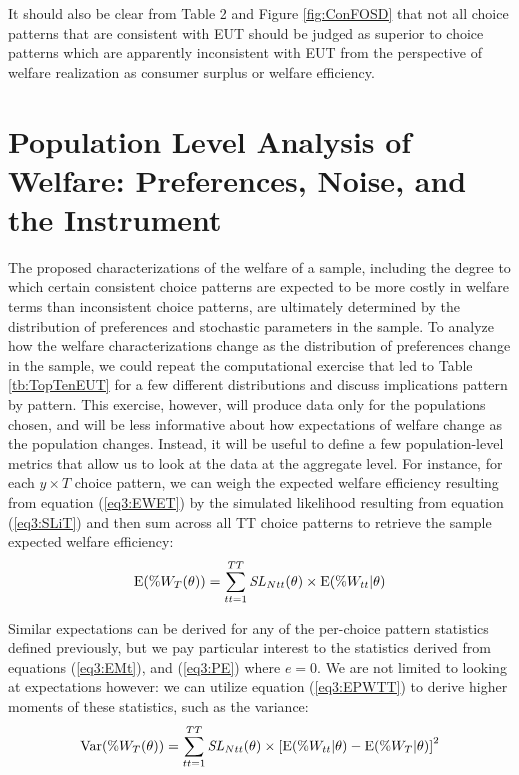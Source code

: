 \documentclass[../main.tex]{subfiles}
\begin{document}
It should also be clear from Table 2 and Figure \ref{fig:ConFOSD} that not all choice patterns that are consistent with EUT should be judged as superior to choice patterns which are apparently inconsistent with EUT from the perspective of welfare realization as consumer surplus or welfare efficiency.

\singlespacing
\section{Population Level Analysis of Welfare: Preferences, Noise, and the Instrument}
\doublespacing

The proposed characterizations of the welfare of a sample, including the degree to which certain consistent choice patterns are expected to be more costly in welfare terms than inconsistent choice patterns, are ultimately determined by the distribution of preferences and stochastic parameters in the sample.
To analyze how the welfare characterizations change as the distribution of preferences change in the sample, we could repeat the computational exercise that led to Table \ref{tb:TopTenEUT} for a few different distributions and discuss implications pattern by pattern.
This exercise, however, will produce data only for the populations chosen, and will be less informative about how expectations of welfare change as the population changes.
Instead, it will be useful to define a few population-level metrics that allow us to look at the data at the aggregate level.
For instance, for each $y \times T$ choice pattern, we can weigh the expected welfare efficiency resulting from equation (\ref{eq3:EWET}) by the simulated likelihood resulting from equation (\ref{eq3:SLiT}) and then sum across all TT choice patterns to retrieve the sample expected welfare efficiency:
\begin{equation}
	\label{eq3:EPWTT}
	\operatorname{E}(\%W_T(\theta)) = \sum_{tt=1}^{TT} \mathit{SL}_{Ntt}(\theta) \times \operatorname{E}(\%W_{tt} | \theta)
\end{equation}

Similar expectations can be derived for any of the per-choice pattern statistics defined previously, but we pay particular interest to the statistics derived from equations (\ref{eq3:EMt}), and (\ref{eq3:PE}) where $e=0$.
We are not limited to looking at expectations however: we can utilize equation (\ref{eq3:EPWTT}) to derive higher moments of these statistics, such as the variance:
\begin{equation}
	\label{eq3:VPWTT}
	\operatorname{Var}(\%W_T(\theta)) = \sum_{tt=1}^{TT} \mathit{SL}_{Ntt}(\theta) \times \left[ \operatorname{E}(\%W_{tt} | \theta) - \operatorname{E}(\%W_T | \theta) \right]^2
\end{equation}
\end{document}
